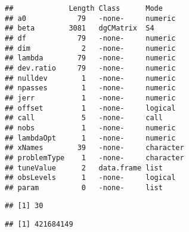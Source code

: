 \documentclass[
]{article}
\newenvironment{Shaded}{\begin{snugshade}}{\end{snugshade}}
\newcommand{\AttributeTok}[1]{\textcolor[rgb]{0.77,0.63,0.00}{#1}}
\newcommand{\CommentTok}[1]{\textcolor[rgb]{0.56,0.35,0.01}{\textit{#1}}}
\newcommand{\DecValTok}[1]{\textcolor[rgb]{0.00,0.00,0.81}{#1}}
\newcommand{\FloatTok}[1]{\textcolor[rgb]{0.00,0.00,0.81}{#1}}
\newcommand{\FunctionTok}[1]{\textcolor[rgb]{0.00,0.00,0.00}{#1}}
\newcommand{\NormalTok}[1]{#1}
\newcommand{\OtherTok}[1]{\textcolor[rgb]{0.56,0.35,0.01}{#1}}
\newcommand{\SpecialCharTok}[1]{\textcolor[rgb]{0.00,0.00,0.00}{#1}}
\begin{document}
\begin{verbatim}
##             Length Class      Mode     
## a0            79   -none-     numeric  
## beta        3081   dgCMatrix  S4       
## df            79   -none-     numeric  
## dim            2   -none-     numeric  
## lambda        79   -none-     numeric  
## dev.ratio     79   -none-     numeric  
## nulldev        1   -none-     numeric  
## npasses        1   -none-     numeric  
## jerr           1   -none-     numeric  
## offset         1   -none-     logical  
## call           5   -none-     call     
## nobs           1   -none-     numeric  
## lambdaOpt      1   -none-     numeric  
## xNames        39   -none-     character
## problemType    1   -none-     character
## tuneValue      2   data.frame list     
## obsLevels      1   -none-     logical  
## param          0   -none-     list
\end{verbatim}

\begin{Shaded}
\end{Shaded}

\begin{verbatim}
## [1] 30
\end{verbatim}

\begin{Shaded}
\end{Shaded}

\begin{verbatim}
## [1] 421684149
\end{verbatim}
\end{document}
